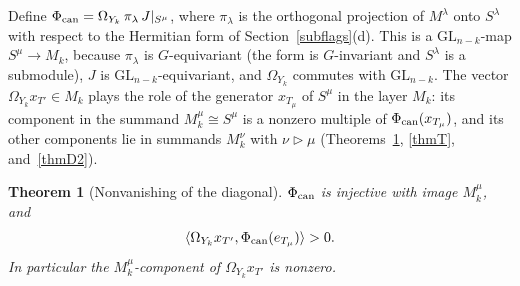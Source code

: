 \documentclass[11pt, letterpaper]{amsart}
\newtheorem{theorem}{Theorem}
\theoremstyle{definition}
\theoremstyle{remark}
\newcommand{\GL}{\mathrm{GL}}
\begin{document}
Define $\Phi_{\rm can}=\Omega_{Y_k}\,\pi_\lambda\,J|_{S^\mu}$, where $\pi_\lambda$ is the orthogonal projection of $M^\lambda$ onto $S^\lambda$ with respect to the Hermitian form of Section~\ref{subflags}(d). This is a $\GL_{n-k}$-map $S^\mu\to M_k$, because $\pi_\lambda$ is $G$-equivariant (the form is $G$-invariant and $S^\lambda$ is a submodule), $J$ is $\GL_{n-k}$-equivariant, and $\Omega_{Y_k}$ commutes with $\GL_{n-k}$. The vector $\Omega_{Y_k}x_{T'}\in M_k$ plays the role of the generator $x_{T_\mu}$ of $S^\mu$ in the layer $M_k$: its component in the summand $M_k^\mu\cong S^\mu$ is a nonzero multiple of $\Phi_{\rm can}(x_{T_\mu})$, and its other components lie in summands $M_k^\nu$ with $\nu\triangleright\mu$ (Theorems~\ref{thmD1}, \ref{thmT}, and~\ref{thmD2}).

\begin{theorem}[Nonvanishing of the diagonal]\label{thmD1}
$\Phi_{\rm can}$ is injective with image $M_k^\mu$, and
\[
\langle \Omega_{Y_k}x_{T'},\Phi_{\rm can}(e_{T_\mu})\rangle>0.
\]
In particular the $M_k^\mu$-component of $\Omega_{Y_k}x_{T'}$ is nonzero.
\end{theorem}
\end{document}
